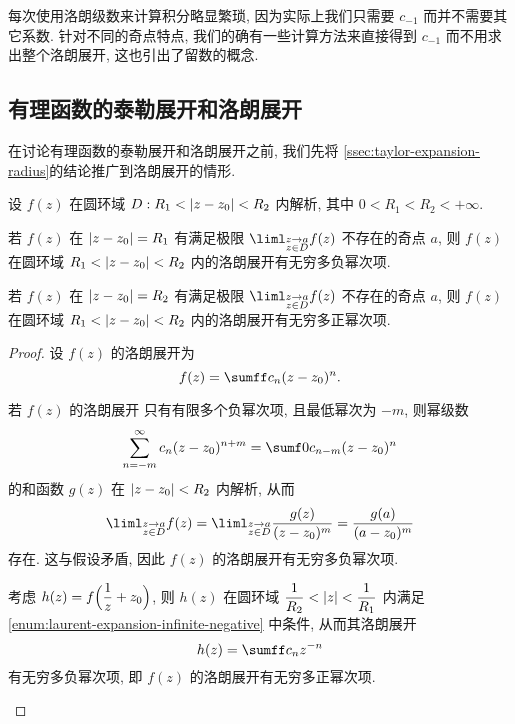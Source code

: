 每次使用洛朗级数来计算积分略显繁琐, 因为实际上我们只需要 $c_{-1}$ 而并不需要其它系数.
针对不同的奇点特点, 我们的确有一些计算方法来直接得到 $c_{-1}$ 而不用求出整个洛朗展开, 这也引出了留数的概念.


\subsection{有理函数的泰勒展开和洛朗展开\optional}
\label{ssec:rational-function-expansion}

在讨论有理函数的泰勒展开和洛朗展开之前, 我们先将 \ref{ssec:taylor-expansion-radius}的结论推广到洛朗展开的情形.

\begin{theorem}
  设 $f(z)$ 在圆环域 $D:R_1<\left|z-z_0\right|<R_2$ 内解析, 其中 $0<R_1<R_2<+\infty$.
  \begin{enuma}
    \item 若 $f(z)$ 在 $\left|z-z_0\right|=R_1$ 有满足极限
    $
      \liml_{\substack{z\ra a\\ z\in D}} f(z)
    $
    不存在的奇点 $a$, 则 $f(z)$ 在圆环域 $R_1<\left|z-z_0\right|<R_2$ 内的洛朗展开有无穷多负幂次项.
    \label{enum:laurent-expansion-infinite-negative}
    \item 若 $f(z)$ 在 $\left|z-z_0\right|=R_2$ 有满足极限
    $
      \liml_{\substack{z\ra a\\z\in D}} f(z)
    $
    不存在的奇点 $a$, 则 $f(z)$ 在圆环域 $R_1<\left|z-z_0\right|<R_2$ 内的洛朗展开有无穷多正幂次项.
  \end{enuma}
\end{theorem}

\begin{proof}
  设 $f(z)$ 的洛朗展开为
  \[
    f(z)=\sumff c_n(z-z_0)^n.
  \]
  \begin{enuma}
    \item 若 $f(z)$ 的洛朗展开
    只有有限多个负幂次项, 且最低幂次为 $-m$, 则幂级数
    \[
        \sum_{n=-m}^\infty c_n(z-z_0)^{n+m}
      =\sumf0 c_{n-m}(z-z_0)^n
    \]
    的和函数 $g(z)$ 在 $\left|z-z_0\right|<R_2$ 内解析, 从而
    \[
      \liml_{\substack{z\ra a\\z\in D}} f(z)
      =\liml_{\substack{z\ra a\\z\in D}} \frac{g(z)}{(z-z_0)^m}
      =\frac{g(a)}{(a-z_0)^m}
    \]
    存在.
    这与假设矛盾, 因此 $f(z)$ 的洛朗展开有无穷多负幂次项.
    \item 考虑 $h(z)=f\Bigl(\dfrac1z+z_0\Bigr)$, 则 $h(z)$ 在圆环域 $\dfrac 1{R_2}<\left|z\right|<\dfrac 1{R_1}$ 内满足 \ref{enum:laurent-expansion-infinite-negative} 中条件, 从而其洛朗展开
    \[
      h(z)=\sumff c_nz^{-n}
    \]
    有无穷多负幂次项, 即 $f(z)$ 的洛朗展开有无穷多正幂次项.
    \qedhere
  \end{enuma}
\end{proof}

